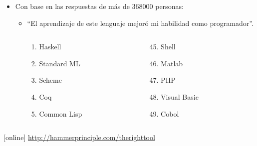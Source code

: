 \documentclass[spanish]{beamer}
\begin{document}

\begin{frame}
  \begin{itemize}
  \item
    Con base en las respuestas de más de 368000 personas:
    \begin{itemize}
    \item
      ``El aprendizaje de este lenguaje mejoró mi habilidad como
      programador''.
      \begin{columns}[T]
        \begin{column}{3cm}
          \begin{enumerate}
          \item Haskell
          \item Standard ML
          \item Scheme
          \item Coq
          \item Common Lisp
          \end{enumerate}
        \end{column}
        \begin{column}{3cm}
          \begin{enumerate}
          \setcounter{enumi}{44}
          \item Shell
          \item Matlab
          \item PHP
          \item Visual Basic
          \item Cobol
          \end{enumerate}
        \end{column}
      \end{columns}
    \end{itemize}
  \end{itemize}
  \begin{thebibliography}{}
  [online]
    \newblock \url{http://hammerprinciple.com/therighttool}
  \end{thebibliography}
\end{frame}

\end{document}

